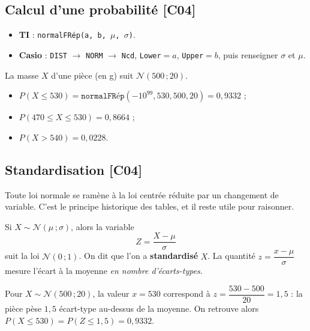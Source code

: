 \documentclass[a4paper,11pt]{article}
\begin{document}
\subsection{Calcul d'une probabilité \hfill {\normalsize\color{uimmred}[C04]}}

\begin{calculatrice}
\begin{itemize}
  \item \textbf{TI} : \texttt{normalFRép(a, b, $\mu$, $\sigma$)}.
  \item \textbf{Casio} : \texttt{DIST} $\rightarrow$ \texttt{NORM} $\rightarrow$ \texttt{Ncd}, \texttt{Lower}$=a$, \texttt{Upper}$=b$, puis renseigner $\sigma$ et $\mu$.
\end{itemize}
\end{calculatrice}

\begin{exemple}
La masse $X$ d'une pièce (en g) suit $\mathcal{N}(500\,;20)$.
\begin{itemize}
  \item $P(X \leq 530) = \texttt{normalFRép}(-10^{99}, 530, 500, 20) = 0{,}9332$ ;
  \item $P(470 \leq X \leq 530) = 0{,}8664$ ;
  \item $P(X > 540) = 0{,}0228$.
\end{itemize}
\end{exemple}

\subsection{Standardisation \hfill {\normalsize\color{uimmred}[C04]}}

Toute loi normale se ramène à la loi centrée réduite par un changement de variable. C'est le principe historique des tables, et il reste utile pour raisonner.

\begin{theoreme}
Si $X \sim \mathcal{N}(\mu\,;\sigma)$, alors la variable
\[
\boxed{Z = \frac{X - \mu}{\sigma}}
\]
suit la loi $\mathcal{N}(0\,;1)$. On dit que l'on a \textbf{standardisé} $X$. La quantité $z = \dfrac{x-\mu}{\sigma}$ mesure l'écart à la moyenne \emph{en nombre d'écarts-types}.
\end{theoreme}

\begin{exemple}[-- Interprétation d'un $z$]
Pour $X \sim \mathcal{N}(500\,;20)$, la valeur $x = 530$ correspond à $z = \dfrac{530 - 500}{20} = 1{,}5$ : la pièce pèse $1{,}5$ écart-type au-dessus de la moyenne. On retrouve alors $P(X \leq 530) = P(Z \leq 1{,}5) = 0{,}9332$.
\end{exemple}
\end{document}
